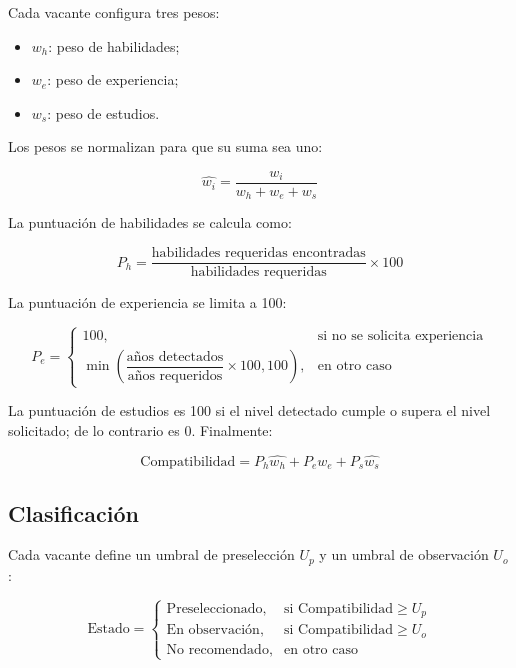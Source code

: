 \documentclass[12pt,a4paper]{article}
\begin{document}
Cada vacante configura tres pesos:

\begin{itemize}[leftmargin=*]
    \item $w_h$: peso de habilidades;
    \item $w_e$: peso de experiencia;
    \item $w_s$: peso de estudios.
\end{itemize}

Los pesos se normalizan para que su suma sea uno:

\begin{equation}
\widehat{w_i} = \frac{w_i}{w_h + w_e + w_s}
\end{equation}

La puntuación de habilidades se calcula como:

\begin{equation}
P_h = \frac{\text{habilidades requeridas encontradas}}{\text{habilidades requeridas}} \times 100
\end{equation}

La puntuación de experiencia se limita a 100:

\begin{equation}
P_e =
\begin{cases}
100, & \text{si no se solicita experiencia} \\
\min\left(\dfrac{\text{años detectados}}{\text{años requeridos}} \times 100, 100\right), & \text{en otro caso}
\end{cases}
\end{equation}

La puntuación de estudios es 100 si el nivel detectado cumple o supera el nivel solicitado; de lo contrario es 0. Finalmente:

\begin{equation}
\text{Compatibilidad} =
P_h \widehat{w_h} +
P_e \widehat{w_e} +
P_s \widehat{w_s}
\end{equation}

\subsection{Clasificación}

Cada vacante define un umbral de preselección $U_p$ y un umbral de observación $U_o$:

\begin{equation}
\text{Estado} =
\begin{cases}
\text{Preseleccionado}, & \text{si Compatibilidad} \ge U_p \\
\text{En observación}, & \text{si Compatibilidad} \ge U_o \\
\text{No recomendado}, & \text{en otro caso}
\end{cases}
\end{equation}
\end{document}
